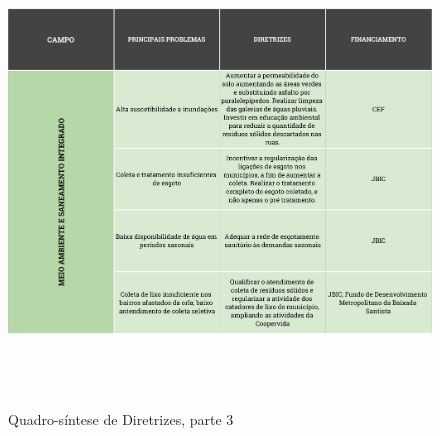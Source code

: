 	\begin{figure}[h]
		\centering
		\caption{Quadro-síntese de Diretrizes, parte 3}
		\includegraphics[width=22cm,height=12.4cm,keepaspectratio]{img/dir03.png}
	\end{figure}

